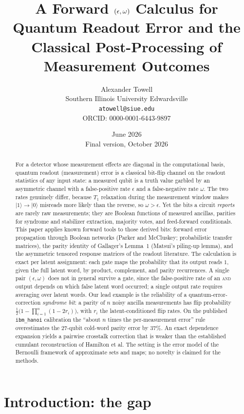 \documentclass[11pt]{article}
\title{\bf A Forward $(\eps,\omega)$ Calculus for Quantum Readout Error and
the Classical Post-Processing of Measurement Outcomes}
\author{Alexander Towell\\
  Southern Illinois University Edwardsville\\
  \texttt{atowell@siue.edu}\\
  ORCID: 0000-0001-6443-9897}
\date{June 2026\\[4pt]\small Final version, October 2026}
\numberwithin{equation}{section}
\theoremstyle{plain}
\theoremstyle{definition}
\theoremstyle{remark}
\newcommand{\eps}{\epsilon}
\newcommand{\ket}[1]{\lvert #1 \rangle}
\begin{document}
\maketitle

\begin{abstract}
For a detector whose measurement effects are diagonal in the computational
basis, quantum readout (measurement) error is a classical bit-flip channel on
the readout statistics of any input state: a measured qubit is a truth value
garbled by an asymmetric channel with a false-positive rate $\eps$ and a
false-negative rate $\omega$. The two rates genuinely differ, because $T_1$
relaxation during the measurement window makes $\ket{1}\!\to\!\ket{0}$ misreads
more likely than the reverse, so $\omega > \eps$. Yet the bits a circuit
\emph{reports} are rarely raw measurements; they are Boolean functions of
measured ancillas, parities for syndrome and stabilizer extraction, majority
votes, and feed-forward conditionals. This paper applies known forward tools
to those derived bits: forward error propagation through Boolean networks
(Parker and McCluskey; probabilistic transfer matrices), the parity identity
of Gallager's Lemma~1 (Matsui's piling-up lemma), and the asymmetric tensored
response matrices of the readout literature. The calculation is exact per
latent assignment: each gate maps the probability that its output reads $1$,
given the full latent word, by product, complement, and parity recurrences.
A single pair $(\eps,\omega)$ does not in general survive a gate, since the
false-positive rate of an \textsc{and} output depends on which false latent
word occurred; a single output rate requires averaging over latent words.
Our lead example is the reliability of a quantum-error-correction
\emph{syndrome bit}: a parity of $n$ noisy ancilla measurements has flip
probability $\tfrac12\bigl(1 - \prod_{i=1}^{n}(1-2r_i)\bigr)$, with $r_i$ the
latent-conditioned flip rates. On the published \texttt{ibm\_hanoi}
calibration the ``about $n$ times the per-measurement error'' rule
overestimates the $27$-qubit cold-word parity error by $37\%$. An exact
dependence expansion yields a pairwise crosstalk correction that is weaker
than the established cumulant reconstruction of Hamilton et al. The setting is
the error model of the Bernoulli framework of approximate sets and maps; no
novelty is claimed for the methods.
\end{abstract}



\section{Introduction: the gap}
\label{sec:intro}
\end{document}
